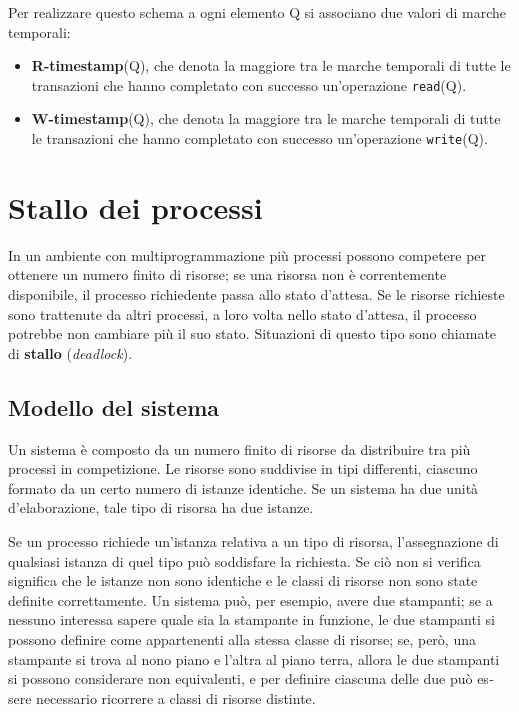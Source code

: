 \documentclass[11pt,a4paper]{article}
\begin{document}
Per realizzare questo schema a ogni elemento Q si associano due valori di marche tem­porali:
\begin{itemize}
  \item \textbf{R-timestamp}(Q), che denota la maggiore tra le marche temporali di tutte le transazio­ni che hanno completato con successo un'operazione \texttt{read}(Q).
  \item \textbf{W-timestamp}(Q), che denota la maggiore tra le marche temporali di tutte le transa­zioni che hanno completato con successo un'operazione \texttt{write}(Q).
\end{itemize}

\section{Stallo dei processi}
In un ambiente con multiprogrammazione più processi possono competere per ottenere un
numero finito di risorse; se una risorsa non è correntemente disponibile, il processo richiedente passa allo stato d'attesa. Se le risorse richieste sono trattenute da altri processi, a loro
volta nello stato d'attesa, il processo potrebbe non cambiare più il suo stato. Situazioni di
questo tipo sono chiamate di \textbf{stallo} (\emph{deadlock}).

\subsection{Modello del sistema}
Un sistema è composto da un numero finito di risorse da distribuire tra più processi in com­petizione. Le risorse sono suddivise in tipi differenti, ciascuno formato da un certo numero
di istanze identiche.
Se un sistema ha due unità d'elabo­razione, tale tipo di risorsa ha due istanze.

Se un processo richiede un'istanza relativa a un tipo di risorsa, l'assegnazione di qual­siasi istanza di quel tipo può soddisfare la richiesta. Se ciò non si verifica significa che le
istanze non sono identiche e le classi di risorse non sono state definite correttamente. Un si­stema può, per esempio, avere due stampanti; se a nessuno interessa sapere quale sia la stam­pante in funzione, le due stampanti si possono definire come appartenenti alla stessa classe
di risorse; se, però, una stampante si trova al nono piano e l'altra al piano terra, allora le due
stampanti si possono considerare non equivalenti, e per definire ciascuna delle due può es­sere necessario ricorrere a classi di risorse distinte.
\end{document}
